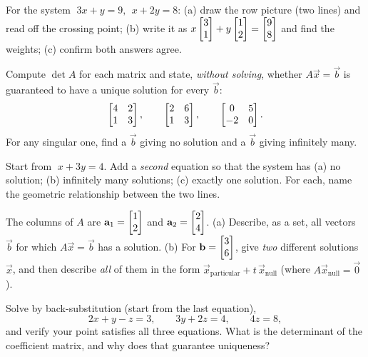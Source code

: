 \begin{exercise}
\label{ch06:ex-both}
For the system $\;3x+y=9,\ \ x+2y=8$:
(a) draw the row picture (two lines) and read off the crossing point;
(b) write it as $x\begin{bmatrix}3\\1\end{bmatrix}+y\begin{bmatrix}1\\2\end{bmatrix}=\begin{bmatrix}9\\8\end{bmatrix}$ and find the
weights; (c) confirm both answers agree.
\end{exercise}

\begin{exercise}
\label{ch06:ex-det}
Compute $\det A$ for each matrix and state, \emph{without solving}, whether
$A\vec x=\vec b$ is guaranteed to have a unique solution for every $\vec b$:
\[
  \begin{bmatrix}4 & 2\\ 1 & 3\end{bmatrix},\qquad
  \begin{bmatrix}2 & 6\\ 1 & 3\end{bmatrix},\qquad
  \begin{bmatrix}0 & 5\\ -2 & 0\end{bmatrix}.
\]
For any singular one, find a $\vec b$ giving no solution and a $\vec b$
giving infinitely many.
\end{exercise}

\begin{exercise}
\label{ch06:ex-fail}
Start from $\;x+3y=4$. Add a \emph{second} equation so that the system has
(a) no solution; (b) infinitely many solutions; (c) exactly one solution.
For each, name the geometric relationship between the two lines.
\end{exercise}

\begin{exercise}
\label{ch06:ex-reach}
The columns of $A$ are $\mathbf{a}_1=\begin{bmatrix}1\\2\end{bmatrix}$ and $\mathbf{a}_2=\begin{bmatrix}2\\4\end{bmatrix}$.
(a) Describe, as a set, all vectors $\vec b$ for which $A\vec x=\vec b$ has a
solution. (b) For $\mathbf{b}=\begin{bmatrix}3\\6\end{bmatrix}$, give \emph{two} different solutions
$\vec x$, and then describe \emph{all} of them in the form
$\vec x_{\text{particular}}+t\,\vec x_{\text{null}}$ (where $A\vec x_{\text{null}}=\vec 0$).
\end{exercise}

\begin{exercise}
\label{ch06:ex-back}
Solve by back-substitution (start from the last equation),
\[
  2x + y - z = 3,\qquad 3y + 2z = 4,\qquad 4z = 8,
\]
and verify your point satisfies all three equations. What is the determinant
of the coefficient matrix, and why does that guarantee uniqueness?
\end{exercise}

